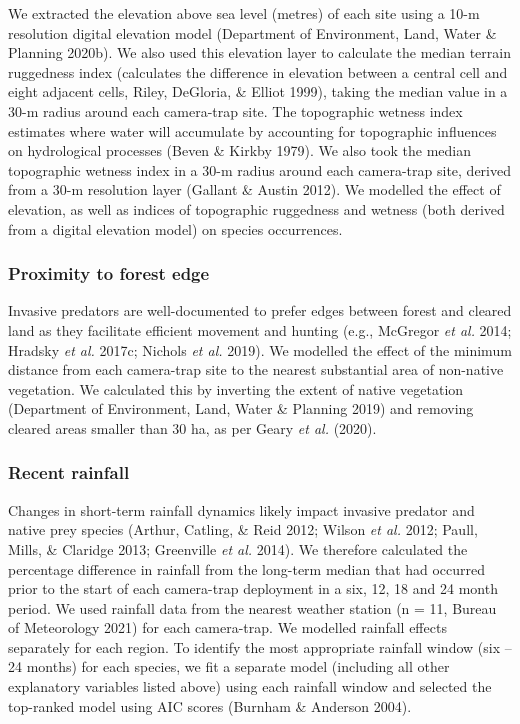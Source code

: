 \documentclass[11pt,a4paper,titlepage,twoside,openright]{style/unimelbthesis}
\begin{document}
\begin{mainmatter}
We extracted the elevation above sea level (metres) of each site using a 10-m resolution digital elevation model (Department of Environment, Land, Water \& Planning 2020b). We also used this elevation layer to calculate the median terrain ruggedness index (calculates the difference in elevation between a central cell and eight adjacent cells, Riley, DeGloria, \& Elliot 1999), taking the median value in a 30-m radius around each camera-trap site. The topographic wetness index estimates where water will accumulate by accounting for topographic influences on hydrological processes (Beven \& Kirkby 1979). We also took the median topographic wetness index in a 30-m radius around each camera-trap site, derived from a 30-m resolution layer (Gallant \& Austin 2012). We modelled the effect of elevation, as well as indices of topographic ruggedness and wetness (both derived from a digital elevation model) on species occurrences.

\hypertarget{proximity-to-forest-edge}{%
\subsubsection{Proximity to forest edge}\label{proximity-to-forest-edge}}

Invasive predators are well-documented to prefer edges between forest and cleared land as they facilitate efficient movement and hunting (e.g., McGregor \emph{et al.} 2014; Hradsky \emph{et al.} 2017c; Nichols \emph{et al.} 2019). We modelled the effect of the minimum distance from each camera-trap site to the nearest substantial area of non-native vegetation. We calculated this by inverting the extent of native vegetation (Department of Environment, Land, Water \& Planning 2019) and removing cleared areas smaller than 30 ha, as per Geary \emph{et al.} (2020).

\hypertarget{recent-rainfall}{%
\subsubsection{Recent rainfall}\label{recent-rainfall}}

Changes in short-term rainfall dynamics likely impact invasive predator and native prey species (Arthur, Catling, \& Reid 2012; Wilson \emph{et al.} 2012; Paull, Mills, \& Claridge 2013; Greenville \emph{et al.} 2014). We therefore calculated the percentage difference in rainfall from the long-term median that had occurred prior to the start of each camera-trap deployment in a six, 12, 18 and 24 month period. We used rainfall data from the nearest weather station (n = 11, Bureau of Meteorology 2021) for each camera-trap. We modelled rainfall effects separately for each region. To identify the most appropriate rainfall window (six -- 24 months) for each species, we fit a separate model (including all other explanatory variables listed above) using each rainfall window and selected the top-ranked model using AIC scores (Burnham \& Anderson 2004).


\end{mainmatter}
\end{document}

